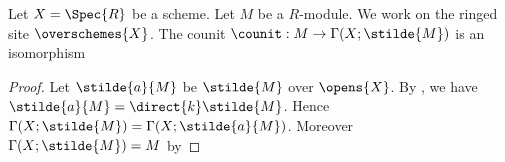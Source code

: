\begin{lemma}
Let $X = \Spec{R}$ be a scheme.
Let $M$ be a $R$-module.
We work on the ringed site $\overschemes{X}$.
The counit $\counit: M\rightarrow \Gamma(X;\stilde{M})$ is an isomorphism
\end{lemma}

\begin{proof}
Let $\stilde{a}{M}$ be $\stilde{M}$ over $\opens{X}$.
By , we have $\stilde{a}{M} = \direct{k}\stilde{M}$.
Hence $\Gamma(X;\stilde{M}) = \Gamma(X;\stilde{a}{M})$.
Moreover $\Gamma(X;\stilde{M}) = M$ by \Cref{} 
\end{proof}